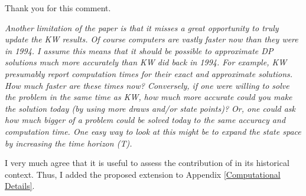 \begin{boenumerate}
Thank you for this comment.\vspace{0.50cm}
\item \textit{Another limitation of the paper is that it misses a great opportunity to truly update the KW results. Of course computers are vastly faster now than they were in 1994. I assume this means that it should be possible to approximate DP solutions much more accurately than KW did back in 1994. For example, KW presumably report computation times for their exact and approximate solutions. How much faster are these times now? Conversely, if one were willing to solve the problem in the same time as KW, how much more accurate could you make the solution today (by using more draws and/or state points)? Or, one could ask how much bigger of a problem could be solved today to the same accuracy and computation time. One easy way to
look at this might be to expand the state space by increasing the time horizon (T).}\vspace{0.5cm}

I very much agree that it is useful to assess the contribution of \citet{Keane.1994} in its historical context. Thus, I added the proposed extension to Appendix \ref{Computational Details}.
\end{boenumerate}
